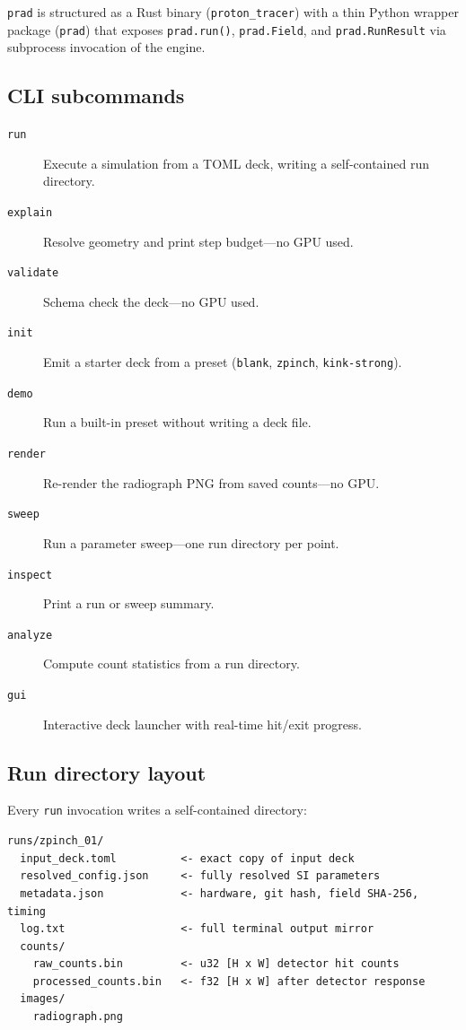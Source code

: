 \documentclass[review,12pt]{elsarticle}
\begin{document}
\texttt{prad} is structured as a Rust binary (\texttt{proton\_tracer}) with a thin Python
wrapper package (\texttt{prad}) that exposes \texttt{prad.run()}, \texttt{prad.Field},
and \texttt{prad.RunResult} via subprocess invocation of the engine.

\subsection{CLI subcommands}

\begin{description}
  \item[\texttt{run}] Execute a simulation from a TOML deck, writing a self-contained
    run directory.
  \item[\texttt{explain}] Resolve geometry and print step budget—no GPU used.
  \item[\texttt{validate}] Schema check the deck—no GPU used.
  \item[\texttt{init}] Emit a starter deck from a preset (\texttt{blank}, \texttt{zpinch},
    \texttt{kink-strong}).
  \item[\texttt{demo}] Run a built-in preset without writing a deck file.
  \item[\texttt{render}] Re-render the radiograph PNG from saved counts—no GPU.
  \item[\texttt{sweep}] Run a parameter sweep—one run directory per point.
  \item[\texttt{inspect}] Print a run or sweep summary.
  \item[\texttt{analyze}] Compute count statistics from a run directory.
  \item[\texttt{gui}] Interactive deck launcher with real-time hit/exit progress.
\end{description}

\subsection{Run directory layout}

Every \texttt{run} invocation writes a self-contained directory:

\begin{lstlisting}
runs/zpinch_01/
  input_deck.toml          <- exact copy of input deck
  resolved_config.json     <- fully resolved SI parameters
  metadata.json            <- hardware, git hash, field SHA-256, timing
  log.txt                  <- full terminal output mirror
  counts/
    raw_counts.bin         <- u32 [H x W] detector hit counts
    processed_counts.bin   <- f32 [H x W] after detector response
  images/
    radiograph.png
\end{lstlisting}
\end{document}
